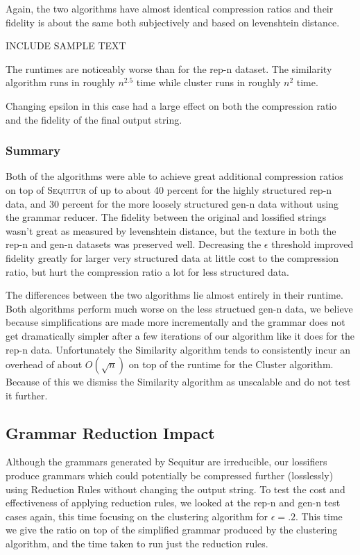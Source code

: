 \documentclass[11pt]{article}
\newcommand{\Sequitur}{\textsc{Sequitur}\xspace}
\begin{document}
Again, the two algorithms have almost identical compression ratios and
their fidelity is about the same both subjectively and based on levenshtein
distance.


INCLUDE SAMPLE TEXT


The runtimes are noticeably worse than for the rep-n dataset. The
similarity algorithm runs in roughly $n^{2.5}$ time while cluster
runs in roughly $n^2$ time. 


Changing epsilon in this case had a large effect on both the compression
ratio and the fidelity of the final output string.

\subsubsection{Summary}

Both of the algorithms were able to achieve great additional compression
ratios on top of \Sequitur of up to about 40 percent for the highly
structured rep-n data, and 30 percent for the more loosely structured
gen-n data without using the grammar reducer. The fidelity between
the original and lossified strings wasn't great as measured by
levenshtein distance, but the texture in both the rep-n and
gen-n datasets was preserved well. Decreasing the $\epsilon$ threshold
improved fidelity greatly for larger very structured data at little
cost to the compression ratio, but hurt the compression ratio
a lot for less structured data.

The differences between the two algorithms lie almost entirely in their
runtime. Both algorithms perform much worse on the less structued
gen-n data, we believe because simplifications are made more incrementally
and the grammar does not get dramatically simpler after a few iterations
of our algorithm like it does for the rep-n data.
Unfortunately the Similarity algorithm tends to consistently incur
an overhead of about $O(\sqrt{n})$ on top of the runtime for the
Cluster algorithm. Because of this we dismiss the Similarity algorithm
as unscalable and do not test it further.

\subsection{Grammar Reduction Impact}
Although the grammars generated by Sequitur are irreducible,
our lossifiers produce grammars which could potentially be
compressed further (losslessly) using Reduction Rules without
changing the output string. To test the cost and
effectiveness of applying reduction rules, we looked at the
rep-n and gen-n test cases again, this time focusing on the
clustering algorithm for $\epsilon = .2$. This time we give the ratio
on top of the simplified grammar produced by the clustering algorithm,
and the time taken to run just the reduction rules.
\end{document}
